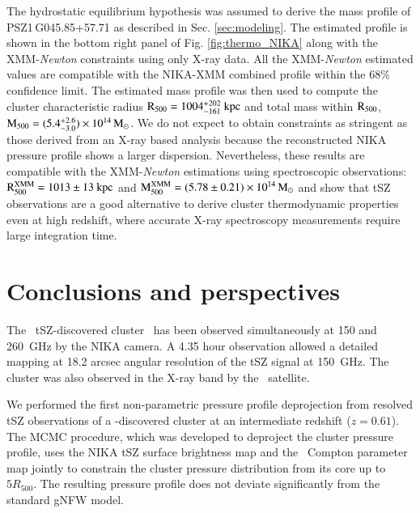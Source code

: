 \documentclass[traditabstract]{aa}
\begin{document}
\indent The hydrostatic equilibrium hypothesis was assumed to derive the mass profile of \mbox{PSZ1\,G045.85+57.71} as described in Sec. \ref{sec:modeling}. The estimated profile is shown in the bottom right panel of Fig. \ref{fig:thermo_NIKA} along with the XMM-{\it Newton} constraints using only X-ray data. All the XMM-{\it Newton} estimated values are compatible with the NIKA-XMM combined profile within the 68\% confidence limit. The estimated mass profile was then used to compute the cluster characteristic radius \mbox{$\rm{R_{500}} = 1004^{+202}_{-161}~kpc$} and total mass within $\rm{R_{500}}$, \mbox{$\rm{M_{500}} = (5.4^{+2.6}_{-3.0})\times 10^{14} \, \rm{M_{\odot}}$}. We do not expect to obtain constraints as stringent as those derived from an X-ray based analysis because the reconstructed NIKA pressure profile shows a larger dispersion. Nevertheless, these results are compatible with the XMM-{\it Newton} estimations using spectroscopic observations: \mbox{$\rm{R_{500}^{XMM}} = 1013 \pm 13~kpc$} and \mbox{$\rm{M_{500}^{XMM}} = (5.78 \pm 0.21)\times 10^{14} \, \rm{M_{\odot}}$} and show that tSZ observations are a good alternative to derive cluster thermodynamic properties even at high redshift, where accurate X-ray spectroscopy measurements require large integration time.

\section{Conclusions and perspectives}\label{sec:conclusions}
The \planck\ tSZ-discovered cluster \psz\ has been observed simultaneously at 150 and 260~GHz by the NIKA camera. A 4.35 hour observation allowed a detailed mapping at 18.2 arcsec angular resolution of the tSZ signal at 150~GHz. The cluster was also observed in the X-ray band by the \xmm\ satellite.

We performed the first non-parametric pressure profile deprojection from resolved tSZ observations of a \planck-discovered cluster at an intermediate redshift ($z=0.61$). The MCMC procedure, which was developed to deproject the cluster pressure profile, uses the NIKA tSZ surface brightness map and the \planck\ Compton parameter map jointly to constrain the cluster pressure distribution from its core up to $5R_{500}$. The resulting pressure profile does not deviate significantly from the standard gNFW model.
\end{document}
